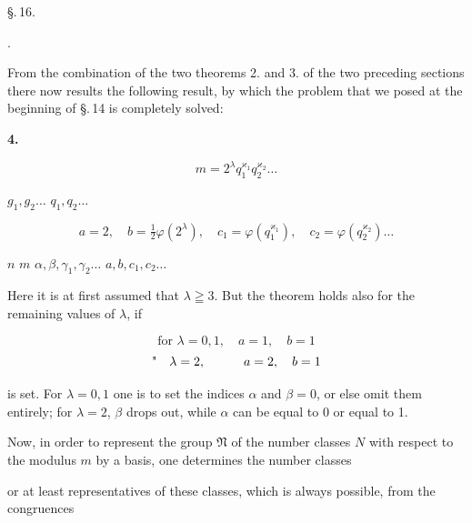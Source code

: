 
\begin{center}
\S.\,16.

.
\end{center}

From the combination of the two theorems 2. and 3. of the two preceding sections there now results the following result, by which the problem that we posed at the beginning of \S.\,14 is completely solved:

\noindent\textbf{4.} 

\[
m = 2^\lambda q_1^{\varkappa_1} q_2^{\varkappa_2} \ldots
\]

 $g_1, g_2 \ldots$  $q_1, q_2 \ldots$

\[
a = 2, \quad b = \tfrac12 \varphi(2^\lambda), \quad c_1 = \varphi(q_1^{\varkappa_1}), \quad c_2 = \varphi(q_2^{\varkappa_2}) \ldots
\]

 $n$  $m$ $\alpha, \beta, \gamma_1, \gamma_2 \ldots$  $a, b, c_1, c_2 \ldots$




Here it is at first assumed that $\lambda \geqq 3$. But the theorem holds also for the remaining values of $\lambda$, if

\[
\text{for } \lambda = 0, 1, \quad a = 1, \quad b = 1
\]
\[
\text{\textquotedbl{}} \quad \lambda = 2, \qquad\quad a = 2, \quad b = 1
\]

is set. For $\lambda = 0, 1$ one is to set the indices $\alpha$ and $\beta = 0$, or else omit them entirely; for $\lambda = 2$, $\beta$ drops out, while $\alpha$ can be equal to 0 or equal to 1.

Now, in order to represent the group $\mathfrak{N}$ of the number classes $N$ with respect to the modulus $m$ by a basis, one determines the number classes


or at least representatives of these classes, which is always possible, from the congruences
